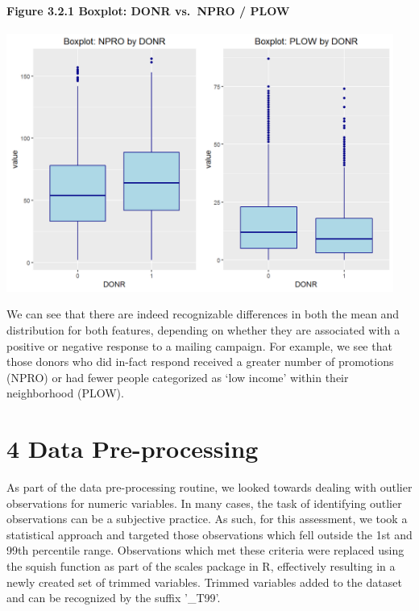 \documentclass[]{article}
\let\oldparagraph\paragraph
\renewcommand{\paragraph}[1]{\oldparagraph{#1}\mbox{}}
\begin{document}
\newpage

\paragraph{Figure 3.2.1 Boxplot: DONR vs.~NPRO /
PLOW}\label{figure-3.2.1-boxplot-donr-vs.npro-plow}

\includegraphics[height=3.33333in]{images/expl_boxcomp_1.png}

We can see that there are indeed recognizable differences in both the
mean and distribution for both features, depending on whether they are
associated with a positive or negative response to a mailing campaign.
For example, we see that those donors who did in-fact respond received a
greater number of promotions (NPRO) or had fewer people categorized as
`low income' within their neighborhood (PLOW).

\section{4 Data Pre-processing}\label{data-pre-processing}

As part of the data pre-processing routine, we looked towards dealing
with outlier observations for numeric variables. In many cases, the task
of identifying outlier observations can be a subjective practice. As
such, for this assessment, we took a statistical approach and targeted
those observations which fell outside the 1st and 99th percentile range.
Observations which met these criteria were replaced using the squish
function as part of the scales package in R, effectively resulting in a
newly created set of trimmed variables. Trimmed variables added to the
dataset and can be recognized by the suffix '\_T99'.
\end{document}

